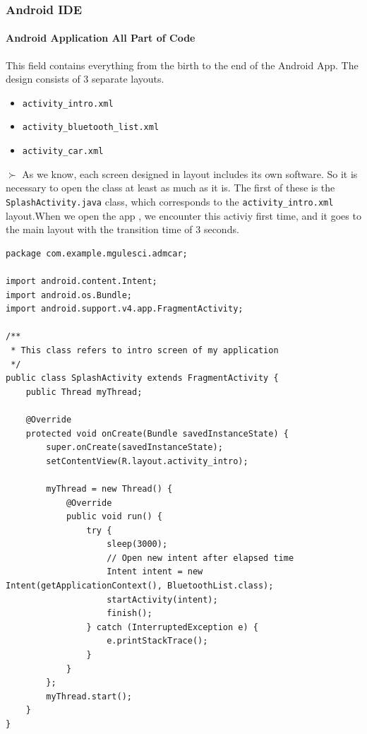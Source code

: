 \documentclass[11pt]{article}
\begin{document}
\pagebreak

\subsubsection{Android IDE}
\paragraph{Android Application All Part of Code}
\begin{flushleft}
This field contains everything from the birth to the end of the Android App. The design consists of 3 separate layouts.
\end{flushleft}
\begin{itemize}
\item \verb|activity_intro.xml|
\item \verb|activity_bluetooth_list.xml|
\item \verb|activity_car.xml|
\end{itemize}
\vspace{0.1cm}
\begin{flushleft}
$\succ$ As we know, each screen designed in layout includes its own software. So it is necessary to open the class at least as much as it is. The first of these is the \verb|SplashActivity.java| class, which corresponds to the \verb|activity_intro.xml| layout.When we open the app , we encounter this activiy first time, and it goes to the main layout with the transition time of 3 seconds. 
\end{flushleft}
\vspace{0.1cm}
\begin{lstlisting}
package com.example.mgulesci.admcar;

import android.content.Intent;
import android.os.Bundle;
import android.support.v4.app.FragmentActivity;

/**
 * This class refers to intro screen of my application
 */
public class SplashActivity extends FragmentActivity {
    public Thread myThread;

    @Override
    protected void onCreate(Bundle savedInstanceState) {
        super.onCreate(savedInstanceState);
        setContentView(R.layout.activity_intro);

        myThread = new Thread() {
            @Override
            public void run() {
                try {
                    sleep(3000);
                    // Open new intent after elapsed time
                    Intent intent = new Intent(getApplicationContext(), BluetoothList.class);
                    startActivity(intent);
                    finish();
                } catch (InterruptedException e) {
                    e.printStackTrace();
                }
            }
        };
        myThread.start();
    }
}
\end{lstlisting}
\end{document}
